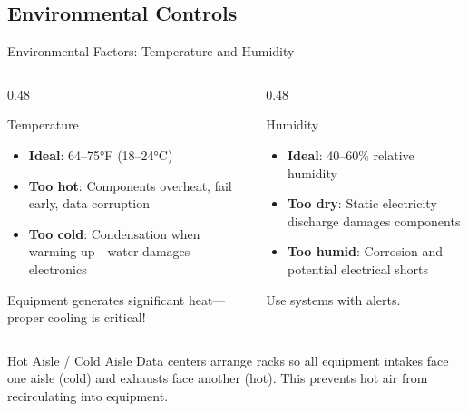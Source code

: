 \documentclass[aspectratio=169]{beamer}  %
\begin{document}
\subsection{Environmental Controls}

\begin{frame}{Environmental Factors: Temperature and Humidity}
    \begin{columns}[T]
        \begin{column}{0.48\textwidth}
            \begin{block}{Temperature}
                \begin{itemize}
                    \item \textbf{Ideal}: 64--75°F (18--24°C)
                    \item \textbf{Too hot}: Components overheat, fail early, data corruption
                    \item \textbf{Too cold}: Condensation when warming up---water damages electronics
                \end{itemize}
                
                \vspace{0.3em}
                Equipment generates significant heat---proper  cooling is critical!
            \end{block}
        \end{column}
        \begin{column}{0.48\textwidth}
            \begin{block}{Humidity}
                \begin{itemize}
                    \item \textbf{Ideal}: 40--60\% relative humidity
                    \item \textbf{Too dry}: Static electricity discharge damages components
                    \item \textbf{Too humid}: Corrosion and potential electrical shorts
                \end{itemize}
                
                \vspace{0.3em}
                Use  systems with alerts.
            \end{block}
        \end{column}
    \end{columns}
    
    \vspace{0.3em}
    \begin{alertblock}{Hot Aisle / Cold Aisle}
        Data centers arrange racks so all equipment intakes face one aisle (cold) and exhausts face another (hot). This prevents hot air from recirculating into equipment.
    \end{alertblock}
\end{frame}
\end{document}

